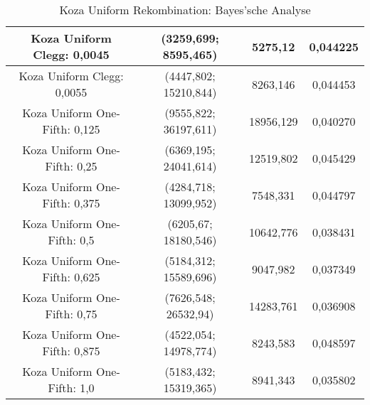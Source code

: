 \begin{table}[H]
\begin{tabular}{c | c | c | c}
		\hline
		Koza Uniform Clegg: 0,0045 & (3259,699; 8595,465) & 5275,12 & 0,044225\\
		\hline
		Koza Uniform Clegg: 0,0055 & (4447,802; 15210,844) & 8263,146 & 0,044453\\
		\hline
		Koza Uniform One-Fifth: 0,125 & (9555,822; 36197,611) & 18956,129 & 0,040270\\
		\hline
		Koza Uniform One-Fifth: 0,25 & (6369,195; 24041,614) & 12519,802 & 0,045429\\
		\hline
		Koza Uniform One-Fifth: 0,375 & (4284,718; 13099,952) & 7548,331 & 0,044797\\
		\hline
		Koza Uniform One-Fifth: 0,5 & (6205,67; 18180,546) & 10642,776 & 0,038431\\
		\hline
		Koza Uniform One-Fifth: 0,625 & (5184,312; 15589,696) & 9047,982 & 0,037349\\
		\hline
		Koza Uniform One-Fifth: 0,75 & (7626,548; 26532,94) & 14283,761 & 0,036908\\
		\hline
		Koza Uniform One-Fifth: 0,875 & (4522,054; 14978,774) & 8243,583 & 0,048597\\
		\hline
		Koza Uniform One-Fifth: 1,0 & (5183,432; 15319,365) & 8941,343 & 0,035802\\
	\end{tabular}
	\label{table:kozaUniformBayesian}
	\caption{Koza Uniform Rekombination: Bayes'sche Analyse}
\end{table}


